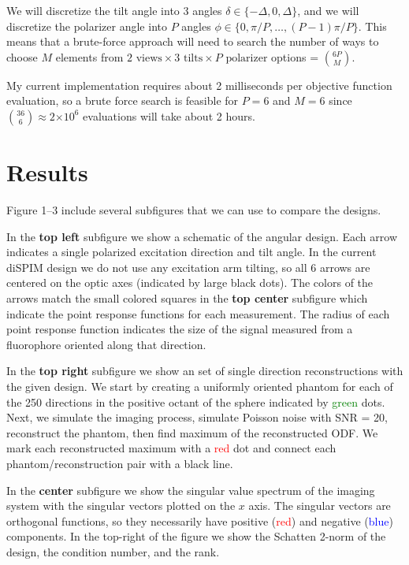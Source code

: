 \documentclass[11pt]{article}
\providecommand{\e}[1]{\ensuremath{\times 10^{#1}}}
\begin{document}
We will discretize the tilt angle into 3 angles
$\delta \in \{-\Delta, 0, \Delta\}$, and we will discretize the polarizer angle
into $P$ angles $\phi \in \{0,\pi/P,\dots,(P-1)\pi/P\}$. This means that a
brute-force approach will need to search the number of ways to choose $M$
elements from $2\,\,\text{views}\times 3\,\,\text{tilts}\times P\,\,\text{polarizer}$
options = $\binom{6P}{M}$.

My current implementation requires about 2 milliseconds per objective function
evaluation, so a brute force search is feasible for $P=6$ and $M=6$ since
$\binom{36}{6} \approx 2\e{6}$ evaluations will take about 2 hours.

\section{Results}\label{sec:results}
Figure 1--3 include several subfigures that we can use to compare the designs.

In the \textbf{top left} subfigure we show a schematic of the angular design.
Each arrow indicates a single polarized excitation direction and tilt angle. In
the current diSPIM design we do not use any excitation arm tilting, so all 6
arrows are centered on the optic axes (indicated by large black dots). The
colors of the arrows match the small colored squares in the \textbf{top center}
subfigure which indicate the point response functions for each measurement. The
radius of each point response function indicates the size of the signal measured
from a fluorophore oriented along that direction.

In the \textbf{top right} subfigure we show an set of single direction
reconstructions with the given design. We start by creating a uniformly oriented
phantom for each of the 250 directions in the positive octant of the sphere
indicated by \textcolor{green}{green} dots. Next, we simulate the imaging
process, simulate Poisson noise with SNR = 20, reconstruct the phantom, then
find maximum of the reconstructed ODF. We mark each reconstructed maximum with a
\textcolor{red}{red} dot and connect each phantom/reconstruction pair with a
black line.

In the \textbf{center} subfigure we show the singular value spectrum of the
imaging system with the singular vectors plotted on the $x$ axis. The singular
vectors are orthogonal functions, so they necessarily have positive
(\textcolor{red}{red}) and negative (\textcolor{blue}{blue}) components. In the
top-right of the figure we show the Schatten 2-norm of the design, the condition
number, and the rank.
\end{document}
